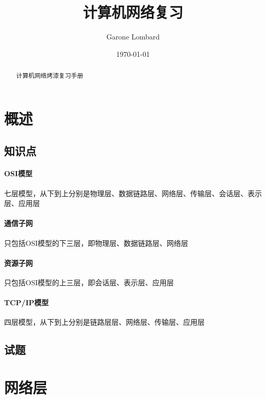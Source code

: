 \documentclass[UTF8]{ctexart} %
\title{计算机网络复习}
\author{Garone Lombard}
\date{\today}
\begin{document}
\maketitle %

\newpage

\begin{abstract}
    计算机网络烤漆复习手册
\end{abstract}

\newpage

\tableofcontents

\newpage

\section{概述}

\subsection{知识点}

\paragraph{OSI模型} 七层模型，从下到上分别是物理层、数据链路层、网络层、传输层、会话层、表示层、应用层

\paragraph{通信子网} 只包括OSI模型的下三层，即物理层、数据链路层、网络层

\paragraph{资源子网} 只包括OSI模型的上三层，即会话层、表示层、应用层

\paragraph{TCP/IP模型} 四层模型，从下到上分别是链路层层、网络层、传输层、应用层

\subsection{试题}

\section{网络层}
\end{document}
